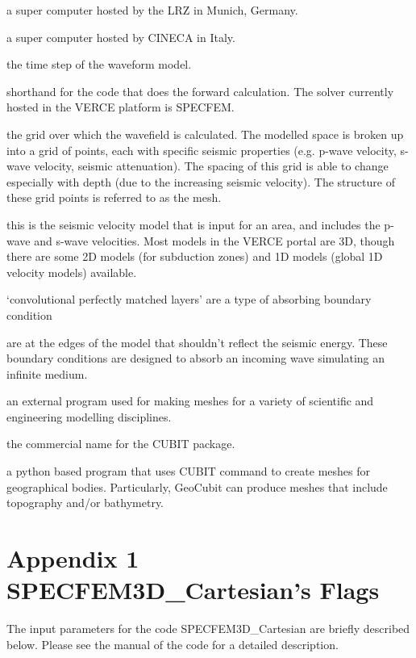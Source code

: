 \documentclass[english]{book}
\begin{document}
 \textendash{} a super computer hosted by the LRZ in Munich, Germany.

 \textendash{} a super computer hosted by CINECA in Italy.

 \textendash{} the time step of the waveform model.

 \textendash{} shorthand for the code that does the forward calculation.
The solver currently hosted in the VERCE platform is SPECFEM.

 \textendash{} the grid over which the wavefield is calculated. The modelled
space is broken up into a grid of points, each with specific seismic
properties (e.g. p-wave velocity, s-wave velocity, seismic attenuation).
The spacing of this grid is able to change especially with depth (due to
the increasing seismic velocity). The structure of these grid points is
referred to as the mesh.

 \textendash{} this is the seismic velocity model that is input
for an area, and includes the p-wave and s-wave velocities. Most models
in the VERCE portal are 3D, though there are some 2D models (for
subduction zones) and 1D models (global 1D velocity models) available.

 \textendash{} ‘convolutional perfectly matched layers’ are a type of
absorbing boundary condition

 \textendash{} are at the edges of the model that
shouldn’t reflect the seismic energy. These boundary conditions are
designed to absorb an incoming wave simulating an infinite medium.

 \textendash{} an external program used for making meshes for a variety of
scientific and engineering modelling disciplines.

 \textendash{} the commercial name for the CUBIT package.

 \textendash{} a python based program that uses CUBIT command to create
meshes for geographical bodies. Particularly, GeoCubit can produce
meshes that include topography and/or bathymetry.


 \appendix
 \renewcommand{\thechapter}{A\arabic{chapter}}
\chapter{Appendix 1 \textendash{} SPECFEM3D\_Cartesian’s Flags}
\label{\detokenize{Appendix1::doc}}\label{\detokenize{Appendix1:appendix-1-specfem3d-cartesians-flags}}
The input parameters for the code SPECFEM3D\_Cartesian are briefly
described below. Please see the manual of the code for a detailed
description.
\end{document}
